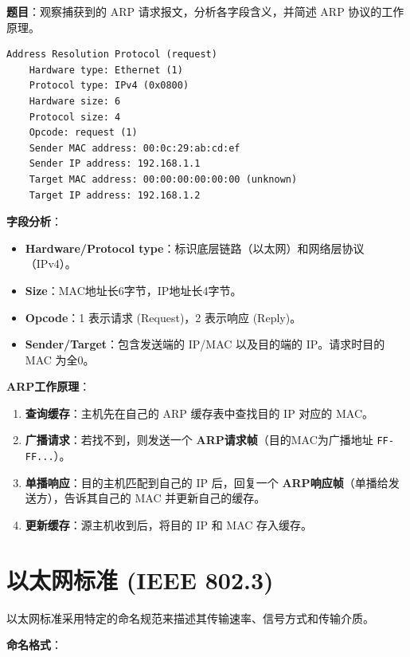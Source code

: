\begin{examplebox}
\textbf{题目}：观察捕获到的 ARP 请求报文，分析各字段含义，并简述 ARP 协议的工作原理。
\begin{lstlisting}[basicstyle=\ttfamily\footnotesize]
Address Resolution Protocol (request)
    Hardware type: Ethernet (1)
    Protocol type: IPv4 (0x0800)
    Hardware size: 6
    Protocol size: 4
    Opcode: request (1)
    Sender MAC address: 00:0c:29:ab:cd:ef
    Sender IP address: 192.168.1.1
    Target MAC address: 00:00:00:00:00:00 (unknown)
    Target IP address: 192.168.1.2
\end{lstlisting}
\tcblower
\textbf{字段分析}：
\begin{itemize}[itemsep=0pt]
    \item \textbf{Hardware/Protocol type}：标识底层链路（以太网）和网络层协议（IPv4）。
    \item \textbf{Size}：MAC地址长6字节，IP地址长4字节。
    \item \textbf{Opcode}：1 表示请求 (Request)，2 表示响应 (Reply)。
    \item \textbf{Sender/Target}：包含发送端的 IP/MAC 以及目的端的 IP。请求时目的 MAC 为全0。
\end{itemize}

\textbf{ARP工作原理}：
\begin{enumerate}[itemsep=0pt]
    \item \textbf{查询缓存}：主机先在自己的 ARP 缓存表中查找目的 IP 对应的 MAC。
    \item \textbf{广播请求}：若找不到，则发送一个 \textbf{ARP请求帧}（目的MAC为广播地址 \texttt{FF-FF...}）。
    \item \textbf{单播响应}：目的主机匹配到自己的 IP 后，回复一个 \textbf{ARP响应帧}（单播给发送方），告诉其自己的 MAC 并更新自己的缓存。
    \item \textbf{更新缓存}：源主机收到后，将目的 IP 和 MAC 存入缓存。
\end{enumerate}
\end{examplebox}

\section{以太网标准 (IEEE 802.3)}
以太网标准采用特定的命名规范来描述其传输速率、信号方式和传输介质。

\textbf{命名格式}：

